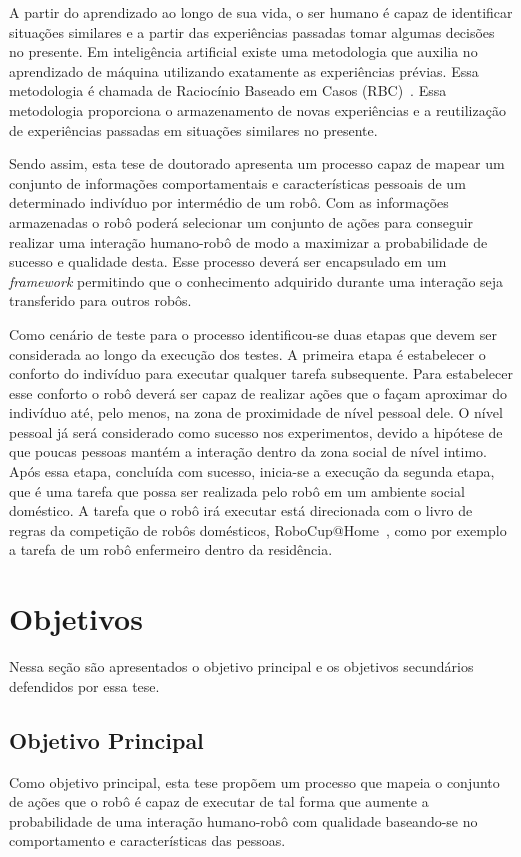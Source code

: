A partir do aprendizado ao longo de sua vida, o ser humano é capaz de identificar situações similares e a partir das experiências passadas tomar algumas decisões no presente. Em inteligência artificial existe uma metodologia que auxilia no aprendizado de máquina utilizando exatamente as experiências prévias. Essa metodologia é chamada de Raciocínio Baseado em Casos (RBC)~\cite{Lopez:2013}. Essa metodologia proporciona o armazenamento de novas experiências e a reutilização de experiências passadas em situações similares no presente.

Sendo assim, esta tese de doutorado apresenta um processo capaz de mapear um conjunto de informações comportamentais e características pessoais de um determinado indivíduo por intermédio de um robô. Com as informações armazenadas o robô poderá selecionar um conjunto de ações para conseguir realizar uma interação humano-robô de modo a maximizar a probabilidade de sucesso e qualidade desta. Esse processo deverá ser encapsulado em um \emph{framework} permitindo que o conhecimento adquirido durante uma interação seja transferido para outros robôs.

Como cenário de teste para o processo identificou-se duas etapas que devem ser considerada ao longo da execução dos testes. A primeira etapa é estabelecer o conforto do indivíduo para executar qualquer tarefa subsequente. Para estabelecer esse conforto o robô deverá ser capaz de realizar ações que o façam aproximar do indivíduo até, pelo menos, na zona de proximidade de nível pessoal dele. O nível pessoal já será considerado como sucesso nos experimentos, devido a hipótese de que poucas pessoas mantém a interação dentro da zona social de nível intimo. Após essa etapa, concluída com sucesso, inicia-se a execução da segunda etapa, que é uma tarefa que possa ser realizada pelo robô em um ambiente social doméstico. A tarefa que o robô irá executar está direcionada com o livro de regras da competição de robôs domésticos, RoboCup@Home~\cite{Robocup:2015}, como por exemplo a tarefa de um robô enfermeiro dentro da residência.

\section{Objetivos}
Nessa seção são apresentados o objetivo principal e os objetivos secundários defendidos por essa tese.

\subsection{Objetivo Principal}
Como objetivo principal, esta tese propõem um processo que mapeia o conjunto de ações que o robô é capaz de executar de tal forma que aumente a probabilidade de uma interação humano-robô com qualidade baseando-se no comportamento e características das pessoas.


